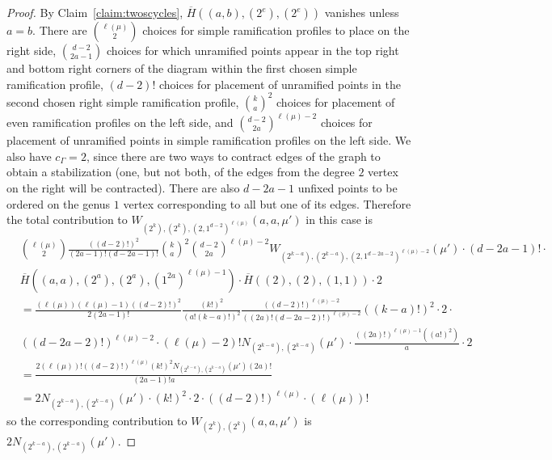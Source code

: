\documentclass[thesis]{thesis-umich}           %
\theoremstyle{definition}
\begin{document}
\begin{proof}
                By Claim~\ref{claim:twoscycles}, $\overline H((a,b),(2^e),(2^e))$ vanishes unless $a=b$.
                There are $\binom{\ell(\mu)}{2}$ choices for simple ramification profiles to place on the right
                side, $\binom{d-2}{2a-1}$ choices for which unramified points appear in the top right
                and bottom right corners of the diagram within the first chosen simple ramification profile,
                $(d-2)!$ choices for placement of unramified points in the second chosen
                right simple ramification profile, $\binom ka^2$ choices for placement of even ramification profiles
                on the left side, and $\binom{d-2}{2a}^{\ell(\mu)-2}$ choices for placement of unramified points in
                simple ramification profiles on the left side.
                We also have $c_{\Gamma}=2$, since there are two ways to contract
                edges of the graph to obtain a stabilization (one, but not
                both, of the edges from the degree $2$ vertex on the right
                will be contracted).
                There are also $d-2a-1$ unfixed points to be ordered
                on the genus $1$ vertex
                corresponding to all but one of its edges.
                Therefore the total
                contribution to $W_{(2^k),(2^k),(2,1^{d-2})^{\ell(\mu)}}(a,a,\mu')$ in this case is
                \begin{align*}
                  &\binom{\ell(\mu)}{2}\frac{((d-2)!)^2}{(2a-1)!(d-2a-1)!}\binom ka^2\binom{d-2}{2a}^{\ell(\mu)-2}W_{(2^{k-a}),(2^{k-a}),(2,1^{d-2a-2})^{\ell(\mu)-2}}(\mu')\cdot (d-2a-1)!\cdot  \\
                  &
                  \overline H((a,a),(2^a),(2^a),(1^{2a})^{\ell(\mu)-1}) \cdot
                  \overline H((2),(2),(1,1))\cdot 2 \\
                  &=\frac{(\ell(\mu))(\ell(\mu)-1)((d-2)!)^2}{2(2a-1)!}\frac{(k!)^2}{(a!(k-a)!)^2}\frac{((d-2)!)^{\ell(\mu)-2}}{((2a)!(d-2a-2)!)^{\ell(\mu)-2}}((k-a)!)^2\cdot 2 \cdot \\
                  &((d-2a-2)!)^{\ell(\mu)-2}\cdot (\ell(\mu)-2)!N_{(2^{k-a}),(2^{k-a})}(\mu')\cdot\frac{((2a)!)^{\ell(\mu)-1}((a!)^2)}{a}\cdot 2 \\
                  &=\frac{2(\ell(\mu))!((d-2)!)^{\ell(\mu)}(k!)^2N_{(2^{k-a}),(2^{k-a})}(\mu')
                  (2a)!}{(2a-1)!a} \\
                  &=2N_{(2^{k-a}),(2^{k-a})}(\mu')\cdot (k!)^2\cdot 2\cdot ((d-2)!)^{\ell(\mu)}\cdot (\ell(\mu))!
                \end{align*}
                so the corresponding contribution
                to $W_{(2^k),(2^k)}(a,a,\mu')$ is $2N_{(2^{k-a}),(2^{k-a})}(\mu')$.

\end{proof}
\end{document}
